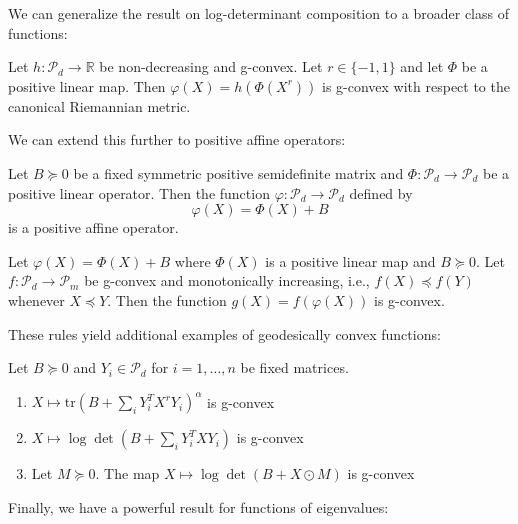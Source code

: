 We can generalize the result on log-determinant composition to a broader class of functions:

\begin{proposition}
Let $h: \mathcal{P}_d \rightarrow \mathbb{R}$ be non-decreasing and g-convex. Let $r \in \{-1, 1\}$ and let $\Phi$ be a positive linear map. Then $\varphi(X) = h(\Phi(X^r))$ is g-convex with respect to the canonical Riemannian metric.
\end{proposition}

We can extend this further to positive affine operators:

\begin{definition}
Let $B \succeq 0$ be a fixed symmetric positive semidefinite matrix and $\Phi: \mathcal{P}_d \rightarrow \mathcal{P}_d$ be a positive linear operator. Then the function $\varphi: \mathcal{P}_d \rightarrow \mathcal{P}_d$ defined by
\begin{equation}
\varphi(X) = \Phi(X) + B
\end{equation}
is a positive affine operator.
\end{definition}

\begin{proposition}
Let $\varphi(X) = \Phi(X) + B$ where $\Phi(X)$ is a positive linear map and $B \succeq 0$. Let $f: \mathcal{P}_d \rightarrow \mathcal{P}_m$ be g-convex and monotonically increasing, i.e., $f(X) \preceq f(Y)$ whenever $X \preceq Y$. Then the function $g(X) = f(\varphi(X))$ is g-convex.
\end{proposition}

These rules yield additional examples of geodesically convex functions:

\begin{example}
Let $B \succeq 0$ and $Y_i \in \mathcal{P}_d$ for $i = 1, \ldots, n$ be fixed matrices.
\begin{enumerate}
\item $X \mapsto \text{tr}\left(B + \sum_i Y_i^T X^r Y_i\right)^\alpha$ is g-convex
\item $X \mapsto \log \det\left(B + \sum_i Y_i^T X Y_i\right)$ is g-convex
\item Let $M \succeq 0$. The map $X \mapsto \log \det(B + X \odot M)$ is g-convex
\end{enumerate}
\end{example}

Finally, we have a powerful result for functions of eigenvalues:

